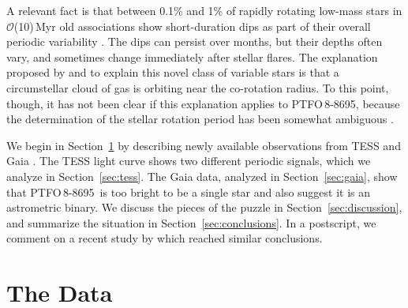 \documentclass[12pt,twocolumn,tighten]{aastex62}
\newcommand{\ptfo}{PTFO$\,$8-8695}
\begin{document}
A relevant fact is that between 0.1\% and 1\% of rapidly rotating
low-mass stars in $\mathcal{O}$(10)$\,$Myr old associations show
short-duration dips as part of their overall periodic variability
\citep{rebull_usco_2018}.  The dips can persist over months, but their
depths often vary, and sometimes change immediately after stellar
flares.  The explanation proposed by \citet{stauffer_orbiting_2017}
and \citet{david_transient_2017} to explain this novel class of
variable stars is that a circumstellar cloud of gas is orbiting near
the co-rotation radius.  To this point, though, it has not been clear
if this explanation applies to \ptfo, because the determination of the
stellar rotation period has been somewhat ambiguous
\citep{van_eyken_ptf_2012,koen_multicolour_2015,raetz_yeti_2016}.

We begin in Section~\ref{sec:observations} by describing newly
available observations from TESS \citep{ricker_transiting_2015} and
Gaia \citep{gaia_collaboration_gaia_2018}.  The TESS light curve shows
two different periodic signals, which we analyze in
Section~\ref{sec:tess}.  The Gaia data, analyzed in
Section~\ref{sec:gaia}, show that \ptfo\ is too bright to be a single
star and also suggest it is an astrometric binary.  We discuss the
pieces of the puzzle in Section~\ref{sec:discussion}, and summarize
the situation in Section~\ref{sec:conclusions}.  In a postscript, we
comment on a recent study by \citet{koen_2020} which reached similar
conclusions.


\section{The Data}
\label{sec:observations}
\end{document}
